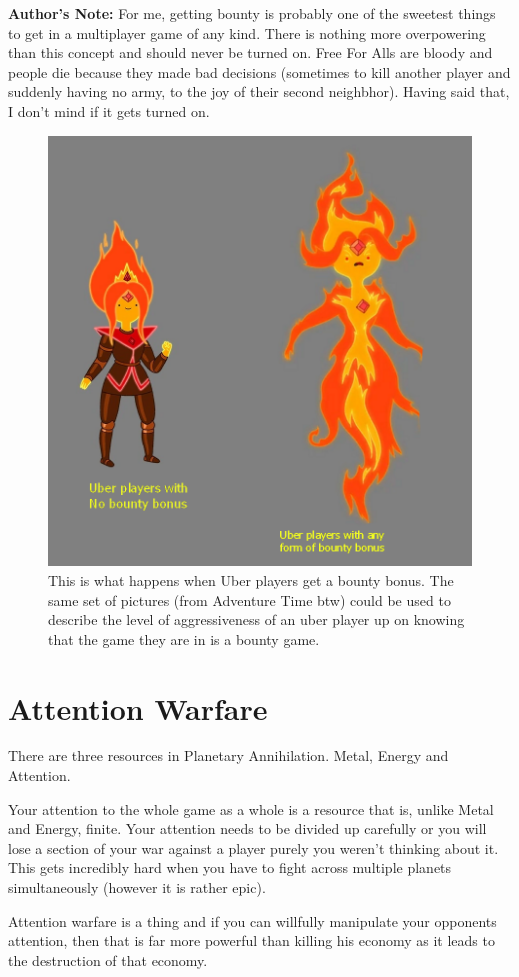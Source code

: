 \documentclass[]{article}
\begin{document}
\textbf{Author's Note: }For me, getting bounty is probably one of the sweetest things to get in a multiplayer game of any kind.  There is nothing more overpowering than this concept and should never be turned on.  Free For Alls are bloody and people die because they made bad decisions (sometimes to kill another player and suddenly having no army, to the joy of their second neighbhor).  Having said that, I don't mind if it gets turned on.  

\begin{figure}[h]
	\centering
	\includegraphics[width=0.5\linewidth]{cOkgxlH}
	\caption{This is what happens when Uber players get a bounty bonus. The same set of pictures (from Adventure Time btw) could be used to describe the level of aggressiveness of an uber player up on knowing that the game they are in is a bounty game.}
	\label{fig:cokgxlh}
\end{figure}




\newpage 
\section{Attention Warfare}\label{sec:attention-warfare}

There are three resources in Planetary Annihilation.  Metal, Energy and Attention.  

Your attention to the whole game as a whole is a resource that is, unlike Metal and Energy, finite. Your attention needs to be divided up carefully or you will lose a section of your war against a player purely you weren't thinking about it.  This gets incredibly hard when you have to fight across multiple planets simultaneously (however it is rather epic).  

Attention warfare is a thing and if you can willfully manipulate your opponents attention, then that is far more powerful than killing his economy as it leads to the destruction of that economy.  
\end{document}
